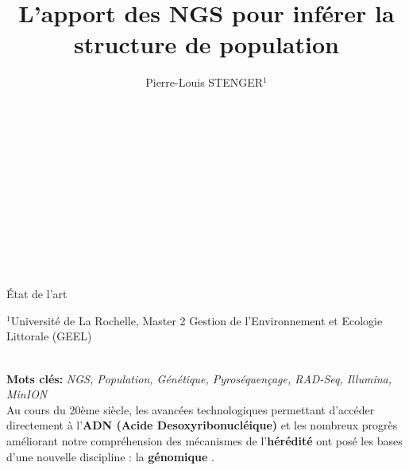 \documentclass[a4paper]{article}
\title{L'apport des NGS pour inférer la structure de population}
\author{Pierre-Louis STENGER$^{1}$}
\date{}                       %
\newlength{\SSFBox}
\newlength{\EFBox}
\newenvironment{BCouleur}[1][]{%
\setkeys{BCouleur}{#1}
  \def\FrameCommand{\fboxrule=\FrameRule \fboxsep=\FrameSep \color{\CTexte}\fcolorbox{\CBord}{\CFond}}
\setlength{\SSFBox}{\SFBox}
\setlength\FrameSep{\the\SSFBox}
  \setlength{\EFBox}{\EpaisFBox}
\setlength\FrameRule{\the\EFBox}
  \MakeFramed{\advance\hsize-\width \FrameRestore}}%
  {\endMakeFramed}
\begin{document}
	
~~\\
~~\\
~~\\
~~\\
~~\\
~~\\
~~\\
~~\\
~~\\


\begin{center}
\Huge État de l'art
\end{center}

\newpage

\maketitle 

\large    
                                                   
$^{1}$Université de La Rochelle, Master 2 Gestion de l'Environnement et Ecologie Littorale (GEEL)




~~\\
\textbf{Mots clés:} \textit{NGS, Population, Génétique, Pyroséquençage, RAD-Seq, Illumina, MinION}
~~\\

Au cours du 20ème siècle, les avancées technologiques permettant d’accéder directement à l’\textbf{ADN (Acide Desoxyribonucléique)} et les nombreux progrès améliorant notre compréhension des mécanismes de l’\textbf{hérédité} ont posé les bases d’une nouvelle discipline : la \textbf{génomique} \cite{eggen2003approches}. 
\end{document}
